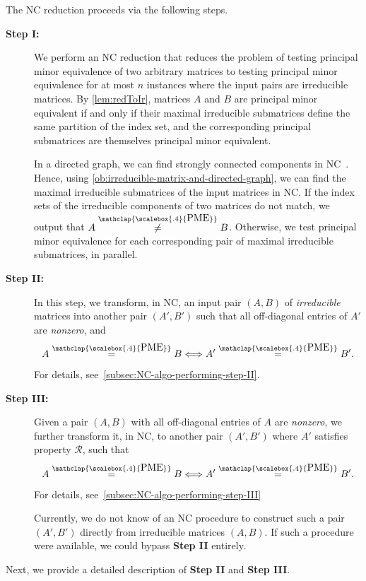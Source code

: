 \documentclass[11pt,letterpaper]{article}
\newcommand{\PME}{\stackrel{\mathclap{\scalebox{.4}{\mbox{PME}}}}{=}}
\newcommand{\nPME}{\stackrel{\mathclap{\scalebox{.4}{\mbox{PME}}}}{\neq}}
\newcommand{\prop}{\mathcal{R}}
\begin{document}
{{{The NC reduction proceeds via the following steps. 
\begin{description}
\item [\textbf{Step I:}] We perform an NC reduction that reduces the problem of testing principal minor equivalence of two arbitrary matrices to testing principal minor equivalence for at most $n$ instances where the input pairs are irreducible matrices. By \cref{lem:redToIr}, matrices $A$ and $B$ are principal minor equivalent if and only if their maximal irreducible submatrices define the same partition of the index set, and the corresponding principal submatrices are themselves principal minor equivalent.

In a directed graph, we can find strongly connected components in NC~\cite{Gazit88, Cole89}. Hence, using \cref{ob:irreducible-matrix-and-directed-graph}, we can find the maximal irreducible submatrices of the input matrices in NC. If the index sets of the irreducible components of two matrices do not match, we output that $A\nPME B$. Otherwise, we test principal minor equivalence for each corresponding pair of maximal irreducible submatrices, in parallel.

\item [\textbf{Step II:}] In this step, we transform, in NC, an input pair $(A, B)$ of \emph{irreducible} matrices into another pair $(A', B')$ such that all off-diagonal entries of $A'$ are \emph{nonzero}, and $$A\PME B\Longleftrightarrow A'\PME B'.$$ For details, see~\cref{subsec:NC-algo-performing-step-II}.

\item [\textbf{Step III:}] Given a pair $(A, B)$ with all off-diagonal entries of $A$ are \emph{nonzero}, we further transform it, in NC, to another pair $(A', B')$ where $A'$ satisfies property $\prop$, such that $$A\PME B\Longleftrightarrow A'\PME B'.$$ For details, see~\cref{subsec:NC-algo-performing-step-III} 

Currently, we do not know of an NC procedure to construct such a pair $(A', B')$ directly from irreducible matrices $(A, B)$. If such a procedure were available, we could bypass \textbf{Step II} entirely. 
\end{description}
Next, we provide a detailed description of \textbf{Step II} and \textbf{Step III}.
}}}
\end{document}
